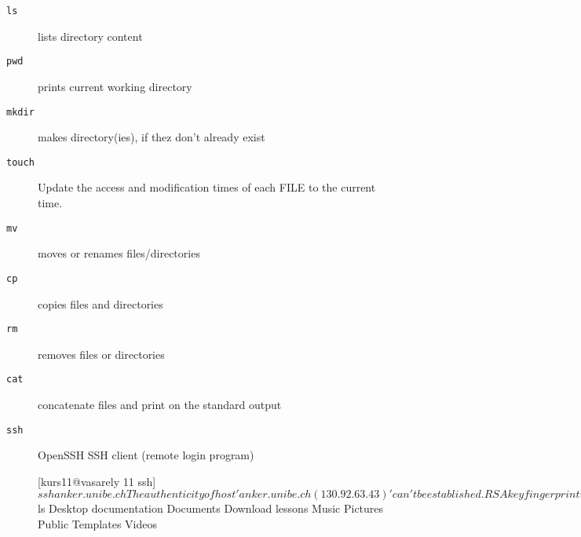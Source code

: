 \documentclass[10pt,a4paper]{scrartcl}
\begin{document}
\begin{description}
\item[\texttt{ls}] lists directory content
\begin{terminalcode}
\end{terminalcode}

\item[\texttt{pwd}] prints current working directory
\begin{terminalcode}
\end{terminalcode}

\item[\texttt{mkdir}] makes directory(ies), if thez don't already exist
\begin{terminalcode}
\end{terminalcode}

\item[\texttt{touch}] Update the access and modification times of each FILE to the current time.
\begin{terminalcode}
\end{terminalcode}

\item[\texttt{mv}] moves or renames files/directories
\begin{terminalcode}
\end{terminalcode}

\item[\texttt{cp}] copies files and directories 
\begin{terminalcode}
\end{terminalcode}

\item[\texttt{rm}] removes files or directories
\begin{terminalcode}
\end{terminalcode}

\item[\texttt{cat}] concatenate files and print on the standard output

\item[\texttt{ssh}] OpenSSH SSH client (remote login program)
\begin{terminalcode}

[kurs11@vasarely 11 ssh]$ ssh anker.unibe.ch 
The authenticity of host 'anker.unibe.ch (130.92.63.43)' can't be established.
RSA key fingerprint is 23:0a:a6:55:86:0e:90:8b:61:49:fc:fc:5b:0b:b6:36.
Are you sure you want to continue connecting (yes/no)? y
Please type 'yes' or 'no': yes
Warning: Permanently added 'anker.unibe.ch,130.92.63.43' (RSA) to the list of known hosts.
kurs11@anker.unibe.ch's password: 
Permission denied, please try again.
kurs11@anker.unibe.ch's password: 
[kurs11@anker ~]$ ls
Desktop  documentation  Documents  Download  lessons  Music  Pictures  Public  Templates  Videos


\end{terminalcode}
\end{description}
\end{document}
